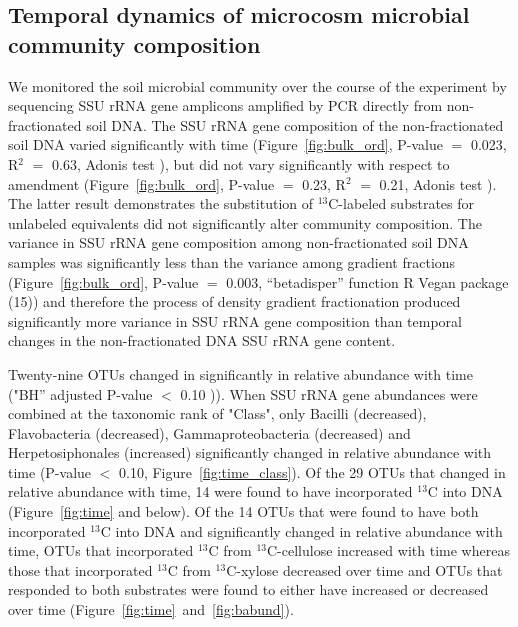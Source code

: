 \subsection{Temporal dynamics of microcosm microbial community composition}
We monitored the soil microbial community over the course of the experiment by
sequencing SSU rRNA gene amplicons amplified by PCR directly from
non-fractionated soil DNA. The SSU rRNA gene composition of the
non-fractionated soil DNA varied significantly with time
(Figure~\ref{fig:bulk_ord}, P-value $=$ 0.023, R$^{2}$ $=$ 0.63, Adonis test
\citet{Anderson2001a}), but did not vary significantly with respect to
amendment (Figure~\ref{fig:bulk_ord}, P-value $=$ 0.23, R$^{2}$ $=$ 0.21,
Adonis test \citet{Anderson2001a}). The latter result demonstrates the
substitution of $^{13}$C-labeled substrates for unlabeled equivalents did not
significantly alter community composition. The variance in SSU rRNA gene
composition among non-fractionated soil DNA samples was significantly less than
the variance among gradient fractions (Figure~\ref{fig:bulk_ord}, P-value $=$
0.003, “betadisper” function R Vegan package \citet{oksanen2007vegan} (15)) and
therefore the process of density gradient fractionation produced
significantly more variance in SSU rRNA gene composition than temporal
changes in the non-fractionated DNA SSU rRNA gene content.

Twenty-nine OTUs changed in significantly in relative abundance with time
("BH” adjusted P-value $<$ 0.10 \citet{YBenjamini1995})). When SSU rRNA
gene abundances were combined at the taxonomic rank of "Class", only
Bacilli (decreased), Flavobacteria (decreased), Gammaproteobacteria
(decreased) and Herpetosiphonales (increased) significantly changed in
relative abundance with time (P-value $<$ 0.10, Figure~\ref{fig:time_class}). Of
the 29 OTUs that changed in relative abundance with time, 14 were found to
have incorporated $^{13}$C into DNA (Figure~\ref{fig:time} and below). Of
the 14 OTUs that were found to have both incorporated $^{13}$C into DNA and
significantly changed in relative abundance with time, OTUs that incorporated
$^{13}$C from $^{13}$C-cellulose increased with time whereas those that
incorporated $^{13}$C from $^{13}$C-xylose decreased over time and OTUs that
responded to both substrates were found to either have increased or decreased
over time (Figure~\ref{fig:time}~and~\ref{fig:babund}).

